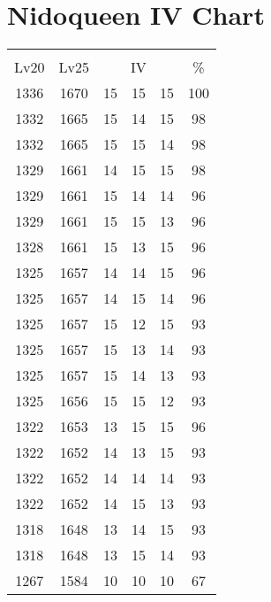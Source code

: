 \documentclass{article}%
\begin{document}
%
\normalsize%
\section{Nidoqueen IV Chart}%
\label{sec:Nidoqueen IV Chart}%
\renewcommand{\arraystretch}{1.5}%
\begin{tabular}{|c|c|c|c|c|c|}%
\hline%
\multicolumn{6}{|c|}{\textcolor{white}{ 
\linebreak{Nidoqueen}
}%
\cellcolor{black}}\\%
\multicolumn{1}{|c}{Lv20}&\multicolumn{1}{c|}{Lv25}&\multicolumn{3}{c|}{IV}&\multicolumn{1}{|c|}{\%}\\%
\hline%
\rowcolor{color100}%
1336&1670&15&15&15&100\\%
\hline%
\rowcolor{color98}%
1332&1665&15&14&15&98\\%
\hline%
\rowcolor{color98}%
1332&1665&15&15&14&98\\%
\hline%
\rowcolor{color98}%
1329&1661&14&15&15&98\\%
\hline%
\rowcolor{color96}%
1329&1661&15&14&14&96\\%
\hline%
\rowcolor{color96}%
1329&1661&15&15&13&96\\%
\hline%
\rowcolor{color96}%
1328&1661&15&13&15&96\\%
\hline%
\rowcolor{color96}%
1325&1657&14&14&15&96\\%
\hline%
\rowcolor{color96}%
1325&1657&14&15&14&96\\%
\hline%
\rowcolor{color93}%
1325&1657&15&12&15&93\\%
\hline%
\rowcolor{color93}%
1325&1657&15&13&14&93\\%
\hline%
\rowcolor{color93}%
1325&1657&15&14&13&93\\%
\hline%
\rowcolor{color93}%
1325&1656&15&15&12&93\\%
\hline%
\rowcolor{color96}%
1322&1653&13&15&15&96\\%
\hline%
\rowcolor{color93}%
1322&1652&14&13&15&93\\%
\hline%
\rowcolor{color93}%
1322&1652&14&14&14&93\\%
\hline%
\rowcolor{color93}%
1322&1652&14&15&13&93\\%
\hline%
\rowcolor{color93}%
1318&1648&13&14&15&93\\%
\hline%
\rowcolor{color93}%
1318&1648&13&15&14&93\\%
\hline%
\rowcolor{color91}%
1267&1584&10&10&10&67\\%
\end{tabular}

%
\end{document}
